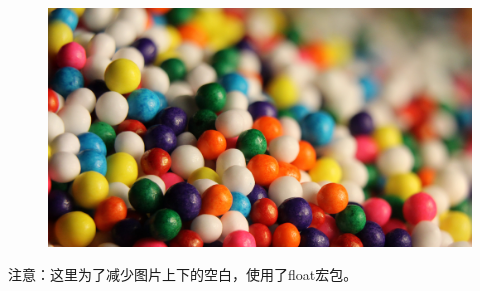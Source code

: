 \begin{figure}[H]
    \centering
    \includegraphics[width=130mm]{./figures/figure_example1.jpg}
\end{figure}
\par 注意：这里为了减少图片上下的空白，使用了float宏包。